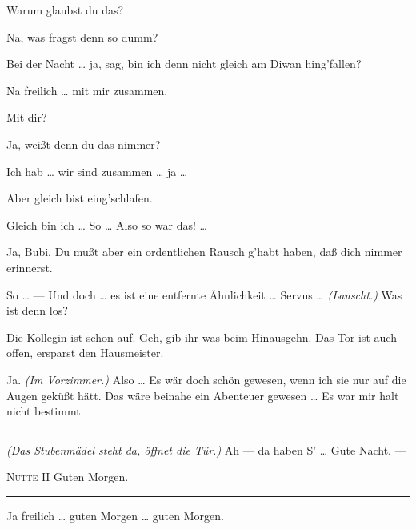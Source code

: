 \documentclass[
	final,
	a4paper,
	ngerman,
	mpinclude = true, %
	twoside = true,
	open = right,
	cleardoublepage = plain,
	DIV = 13,
	BCOR = 1cm,
	titlepage = firstiscover,
	]{scrbook}
\newcommand{\direction}[1]{\textit{(#1)}}
\newenvironment{deletion}{%
		\vspace{0.25\baselineskip}
		\hrule
		\vspace{0.25\baselineskip}
		\color{darkgray}
	}{
		\color{black}
		\vspace{0.25\baselineskip}
		\hrule 
		\vspace{0.25\baselineskip}
	}
\newcommand{\thecharacter}[1]{\textup{\textsc{#1}}\xspace}
\newcommand{\thedirne}{\thecharacter{Nutte}}
\newcommand{\thegraf}{\thecharacter{Entrepeneurin}}
\newcommand{\character}[1]{\item[#1:]}
\newcommand{\dirne}{\character{\thedirne}}
\newcommand{\entrepeneurin}{\character{\thegraf}}
\begin{document}
\begin{play}
	\entrepeneurin
	Warum glaubst du das?

	\dirne
	Na, was fragst denn so dumm?

	\entrepeneurin
	Bei der Nacht \ldots{} ja, sag, bin ich denn nicht gleich am Diwan hing'fallen?

	\dirne
	Na freilich \ldots{} mit mir zusammen.

	\entrepeneurin
	Mit dir?

	\dirne
	Ja, weißt denn du das nimmer?

	\entrepeneurin
	Ich hab \ldots{} wir sind zusammen \ldots{} ja \ldots{}

	\dirne
	Aber gleich bist eing'schlafen.

	\entrepeneurin
	Gleich bin ich \ldots{} So \ldots{} Also so war das! \ldots{}

	\dirne
	Ja, Bubi. Du mußt aber ein ordentlichen Rausch g'habt haben, daß dich nimmer erinnerst.

	\entrepeneurin
	So \ldots{} --- Und doch \ldots{} es ist eine entfernte Ähnlichkeit \ldots{} Servus \ldots{} \direction{Lauscht.} Was ist denn los?

	\dirne
	Die Kollegin ist schon auf. Geh, gib ihr was beim Hinausgehn. Das Tor ist auch offen, ersparst den Hausmeister.

	\entrepeneurin
	Ja. \direction{Im Vorzimmer.} Also \ldots{} Es wär doch schön gewesen, wenn ich sie nur auf die Augen geküßt hätt. Das wäre beinahe ein Abenteuer gewesen \ldots{} Es war mir halt nicht bestimmt.
	\begin{deletion}
		\direction{Das Stubenmädel steht da, öffnet die Tür.} Ah --- da haben S' \ldots{} Gute Nacht. ---

	\textsc{Nutte II}
	Guten Morgen.
	\end{deletion}

	\entrepeneurin
	Ja freilich \ldots{} guten Morgen \ldots{} guten Morgen.

\end{play}
\end{document}
